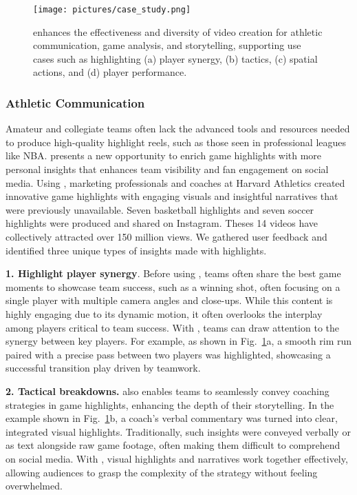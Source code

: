 \begin{figure}[t!]
    \centering
    \texttt{[image: pictures/case\_study.png]}
    \vspace{-6mm}
    \caption{\SB{} enhances the effectiveness and diversity of video creation for athletic communication, game analysis, and storytelling, supporting use cases such as highlighting (a) player synergy, (b) tactics, (c) spatial actions, and (d) player performance.} 
    \label{fig:case_study}
    \vspace{-3mm}
\end{figure}


\subsubsection{Athletic Communication}
Amateur and collegiate teams often lack the advanced tools and resources needed to produce high-quality highlight reels, such as those seen in professional leagues like NBA. \SB{} presents a new opportunity to enrich game highlights with more personal insights that enhances team visibility and fan engagement on social media.
Using \SB{}, marketing professionals and coaches at Harvard Athletics created innovative game highlights with engaging visuals and insightful narratives that were previously unavailable. Seven basketball highlights and seven soccer highlights were produced and shared on Instagram. Theses 14 videos have collectively attracted over 150 million views. 
We gathered user feedback and identified three unique types of insights made with \SB{} highlights.

\textbf{1. Highlight player synergy}. Before using \SB{}, teams often share the best game moments to showcase team success, such as a winning shot, often focusing on a single player with multiple camera angles and close-ups. While this content is highly engaging due to its dynamic motion,  it often overlooks the interplay among players critical to team success. With \SB{}, teams can draw attention to the synergy between key players. For example, as shown in Fig.~\ref{fig:case_study}a, a smooth rim run paired with a precise pass between two players was highlighted, showcasing a successful transition play driven by teamwork.

\textbf{2. Tactical breakdowns.} \SB{} also enables teams to seamlessly convey coaching strategies in game highlights, enhancing the depth of their storytelling. In the example shown in Fig.~\ref{fig:case_study}b, a coach's verbal commentary was turned into clear, integrated visual highlights. Traditionally, such insights were conveyed verbally or as text alongside raw game footage, often making them difficult to comprehend on social media. With \SB{}, visual highlights and narratives work together effectively, allowing audiences to grasp the complexity of the strategy without feeling overwhelmed.

